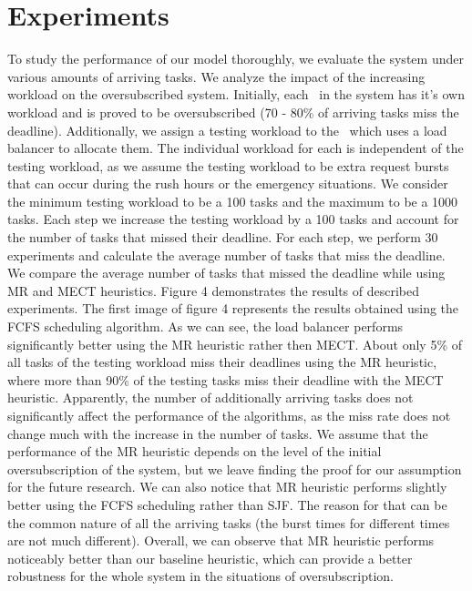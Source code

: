 \section{Experiments}\label{experiments}
To study the performance of our model thoroughly, we evaluate the system under various amounts of arriving tasks. We analyze the impact of the increasing workload on the oversubscribed system. Initially, each \bs~in the system has it's own workload and is proved to be oversubscribed (70 - 80\% of arriving tasks miss the deadline). Additionally, we assign a testing workload to the \bs~which uses a load balancer to allocate them. The individual workload for each \bs is independent of the testing workload, as we assume the testing workload to be extra request bursts that can occur during the rush hours or the emergency situations. We consider the minimum testing workload to be a 100 tasks and the maximum to be a 1000 tasks. Each step we increase the testing workload by a 100 tasks and account for the number of tasks that missed their deadline. For each step, we perform 30 experiments and calculate the average number of tasks that miss the deadline. We compare the average number of tasks that missed the deadline while using MR and MECT heuristics. Figure 4 demonstrates the results of described experiments. The first image of figure 4 represents the results obtained using the FCFS scheduling algorithm. As we can see, the load balancer performs significantly better using the MR heuristic rather then MECT. About only 5\% of all tasks of the testing workload miss their deadlines using the MR heuristic, where more than 90\% of the testing tasks miss their deadline with the MECT heuristic. Apparently, the number of additionally arriving tasks does not significantly affect the performance of the algorithms, as the miss rate does not change much with the increase in the number of tasks. We assume that the performance of the MR heuristic depends on the level of the initial oversubscription of the system, but we leave finding the proof for our assumption for the future research. We can also notice that MR heuristic performs slightly better using the FCFS scheduling rather than SJF. The reason for that can be the common nature of all the arriving tasks (the burst times for different times are not much different). Overall, we can observe that MR heuristic performs noticeably better than our baseline heuristic, which can provide a better robustness for the whole system in the situations of oversubscription. 
